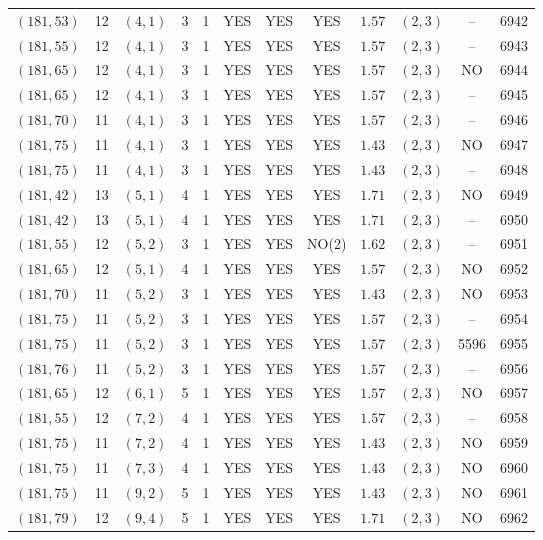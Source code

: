 \begin{longtable}{|c|c|c|c|c|c|c|c|c|c|c|c|}
$(181,53)$ & 12 & $(4,1)$ & 3 & 1 & YES & YES & YES & $1.57$ & $(2,3)$ & -- & 6942\\
$(181,55)$ & 12 & $(4,1)$ & 3 & 1 & YES & YES & YES & $1.57$ & $(2,3)$ & -- & 6943\\
$(181,65)$ & 12 & $(4,1)$ & 3 & 1 & YES & YES & YES & $1.57$ & $(2,3)$ & NO & 6944\\
$(181,65)$ & 12 & $(4,1)$ & 3 & 1 & YES & YES & YES & $1.57$ & $(2,3)$ & -- & 6945\\
$(181,70)$ & 11 & $(4,1)$ & 3 & 1 & YES & YES & YES & $1.57$ & $(2,3)$ & -- & 6946\\
$(181,75)$ & 11 & $(4,1)$ & 3 & 1 & YES & YES & YES & $1.43$ & $(2,3)$ & NO & 6947\\
$(181,75)$ & 11 & $(4,1)$ & 3 & 1 & YES & YES & YES & $1.43$ & $(2,3)$ & -- & 6948\\
$(181,42)$ & 13 & $(5,1)$ & 4 & 1 & YES & YES & YES & $1.71$ & $(2,3)$ & NO & 6949\\
$(181,42)$ & 13 & $(5,1)$ & 4 & 1 & YES & YES & YES & $1.71$ & $(2,3)$ & -- & 6950\\
$(181,55)$ & 12 & $(5,2)$ & 3 & 1 & YES & YES & NO(2) & $1.62$ & $(2,3)$ & -- & 6951\\
$(181,65)$ & 12 & $(5,1)$ & 4 & 1 & YES & YES & YES & $1.57$ & $(2,3)$ & NO & 6952\\
$(181,70)$ & 11 & $(5,2)$ & 3 & 1 & YES & YES & YES & $1.43$ & $(2,3)$ & NO & 6953\\
$(181,75)$ & 11 & $(5,2)$ & 3 & 1 & YES & YES & YES & $1.57$ & $(2,3)$ & -- & 6954\\
$(181,75)$ & 11 & $(5,2)$ & 3 & 1 & YES & YES & YES & $1.57$ & $(2,3)$ & 5596 & 6955\\
$(181,76)$ & 11 & $(5,2)$ & 3 & 1 & YES & YES & YES & $1.57$ & $(2,3)$ & -- & 6956\\
$(181,65)$ & 12 & $(6,1)$ & 5 & 1 & YES & YES & YES & $1.57$ & $(2,3)$ & NO & 6957\\
$(181,55)$ & 12 & $(7,2)$ & 4 & 1 & YES & YES & YES & $1.57$ & $(2,3)$ & -- & 6958\\
$(181,75)$ & 11 & $(7,2)$ & 4 & 1 & YES & YES & YES & $1.43$ & $(2,3)$ & NO & 6959\\
$(181,75)$ & 11 & $(7,3)$ & 4 & 1 & YES & YES & YES & $1.43$ & $(2,3)$ & NO & 6960\\
$(181,75)$ & 11 & $(9,2)$ & 5 & 1 & YES & YES & YES & $1.43$ & $(2,3)$ & NO & 6961\\
$(181,79)$ & 12 & $(9,4)$ & 5 & 1 & YES & YES & YES & $1.71$ & $(2,3)$ & NO & 6962\\

\end{longtable}
